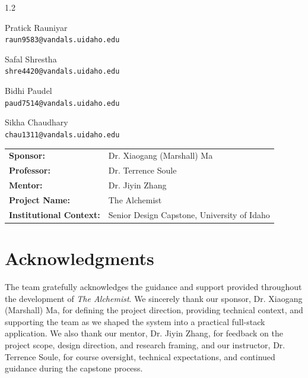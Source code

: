 \documentclass[12pt,oneside]{report}
\begin{document}
\begin{spacing}{1.2}
\begin{center}
\large
Pratick Rauniyar\\
\texttt{raun9583@vandals.uidaho.edu}

\vspace{0.18in}

Safal Shrestha\\
\texttt{shre4420@vandals.uidaho.edu}

\vspace{0.18in}

Bidhi Paudel\\
\texttt{paud7514@vandals.uidaho.edu}

\vspace{0.18in}

Sikha Chaudhary\\
\texttt{chau1311@vandals.uidaho.edu}
\end{center}

\vfill

\begin{tabular}{p{2.0in}p{4.2in}}
\textbf{Sponsor:} & Dr. Xiaogang (Marshall) Ma \\
\textbf{Professor:} & Dr. Terrence Soule \\
\textbf{Mentor:} & Dr. Jiyin Zhang \\
\textbf{Project Name:} & The Alchemist \\
\textbf{Institutional Context:} & Senior Design Capstone, University of Idaho \\
\end{tabular}
\end{spacing}

\clearpage

\section*{Acknowledgments}

\noindent The team gratefully acknowledges the guidance and support provided throughout the development of \emph{The Alchemist}. We sincerely thank our sponsor, Dr. Xiaogang (Marshall) Ma, for defining the project direction, providing technical context, and supporting the team as we shaped the system into a practical full-stack application. We also thank our mentor, Dr. Jiyin Zhang, for feedback on the project scope, design direction, and research framing, and our instructor, Dr. Terrence Soule, for course oversight, technical expectations, and continued guidance during the capstone process.
\end{document}

